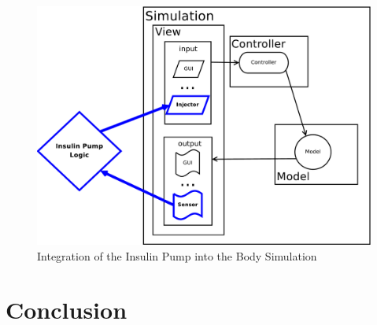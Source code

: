 \documentclass[pdflatex,a4paper,11pt,english]{scrreprt}
\begin{document}
\begin{figure}[htb]
\centering
\includegraphics[scale=0.39]{images/mvc_insulin_pump}
\caption{Integration of the Insulin Pump into the Body Simulation}
\label{fig:mvc_insulin_pump}
\end{figure}

\chapter{Conclusion}
\end{document}
